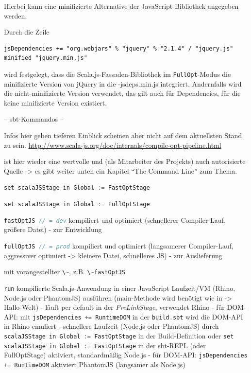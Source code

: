 \documentclass[a4paper, 12pt, hidelinks, listof=totoc, listoftables=totoc, bibliography=totoc]{scrreprt}
\newcommand{\code}[1]{\lstinline[language=Scala, style=inline]|#1|}
\begin{document}
Hierbei kann eine minifizierte Alternative der JavaScript-Bibliothek angegeben werden. 

Durch die Zeile

\begin{lstlisting}[style=snippet]
jsDependencies += "org.webjars" % "jquery" % "2.1.4" / "jquery.js" minified "jquery.min.js"
\end{lstlisting}

wird festgelegt, dass die Scala.js-Fassaden-Bibliothek im \code{FullOpt}-Modus die minifizierte Version von jQuery in die 
-jsdeps.min.js integriert. Andernfalls
wird die nicht-minifizierte Version verwendet, das gilt auch für Dependencies, für die keine minifizierte Version existiert.








-- sbt-Kommandos --

Infos hier geben tieferen Einblick scheinen aber nicht auf dem aktuellsten Stand zu sein.
\url{http://www.scala-js.org/doc/internals/compile-opt-pipeline.html}

\cite[\#TheCommandLine]{haoyi.HOS} ist hier wieder eine wertvolle und (als Mitarbeiter des Projekts) auch autorisierte Quelle -> es gibt weiter unten ein Kapitel "`The Command Line"' zum Thema.

\code{set scalaJSStage in Global := FastOptStage}

\code{set scalaJSStage in Global := FullOptStage}


\code{fastOptJS // = dev} kompiliert und optimiert (schnellerer Compiler-Lauf, größere Datei) - zur Entwicklung

\code{fullOptJS // = prod} kompiliert und optimiert (langsamerer Compiler-Lauf, aggressiver optimiert -> kleinere Datei, schnelleres JS) - zur Auslieferung

mit vorangestellter  \code{\~}, z.B. \code{\~fastOptJS}

\code{run} kompilierte Scala.js-Anwendung in einer JavaScript Laufzeit/VM (Rhino, Node.js oder PhantomJS) ausführen (main-Methode wird benötigt wie in -> Hallo-Welt)
	- läuft per default in der \textit{PreLinkStage}, verwendet Rhino
		- für DOM-API: mit \code{jsDependencies += RuntimeDOM} in der \code{build.sbt} wird die DOM-API in Rhino emuliert
	- schnellere Laufzeit (Node.js oder PhantomJS) durch \code{scalaJSStage in Global := FastOptStage} in der Build-Definition oder \code{set scalaJSStage in Global := FastOptStage} in der sbt-REPL (oder FullOptStage) aktiviert, standardmäßig Node.js
		- für DOM-API: \code{jsDependencies += RuntimeDOM} aktiviert PhantomJS (langsamer als Node.js)
\end{document}
